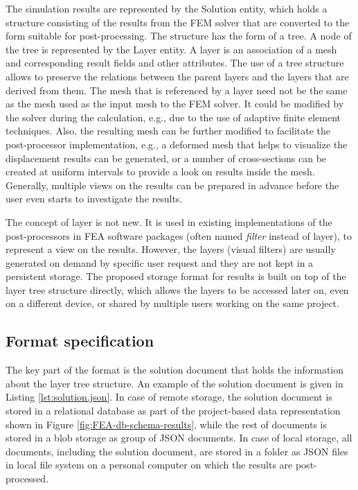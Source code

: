 The simulation results are represented by the Solution entity, which holds a structure consisting of the results from the FEM solver that are converted to the form suitable for post-processing. The structure has the form of a tree. A node of the tree is represented by the Layer entity. A layer is an association of a mesh and corresponding result fields and other attributes. The use of a tree structure allows to preserve the relations between the parent layers and the layers that are derived from them. The mesh that is referenced by a layer need not be the same as the mesh used as the input mesh to the FEM solver. It could be modified by the solver during the calculation, e.g., due to the use of adaptive finite element techniques. Also, the resulting mesh can be further modified to facilitate the post-processor implementation, e.g., a deformed mesh that helps to visualize the displacement results can be generated, or a number of cross-sections can be created at uniform intervals to provide a look on results inside the mesh. Generally, multiple views on the results can be prepared in advance before the user even starts to investigate the results.

The concept of layer is not new. It is used in existing implementations of the post-pro\-ces\-sors in FEA software packages (often named \textit{filter} instead of layer), to represent a view on the results. However, the layers (visual filters) are usually generated on demand by specific user request and they are not kept in a persistent storage. The proposed storage format for results is built on top of the layer tree structure directly, which allows the layers to be accessed later on, even on a different device, or shared by multiple users working on the same project.


\subsection{Format specification}

The key part of the format is the solution document that holds the information about the layer tree structure. An example of the solution document is given in Listing \ref{lst:solution.json}. In case of remote storage, the solution document is stored in a relational database as part of the project-based data representation shown in Figure \ref{fig:FEA-db-schema-results}, while the rest of documents is stored in a blob storage as group of JSON documents. In case of local storage, all documents, including the solution document, are stored in a folder as JSON files in local file system on a personal computer on which the results are post-processed.

